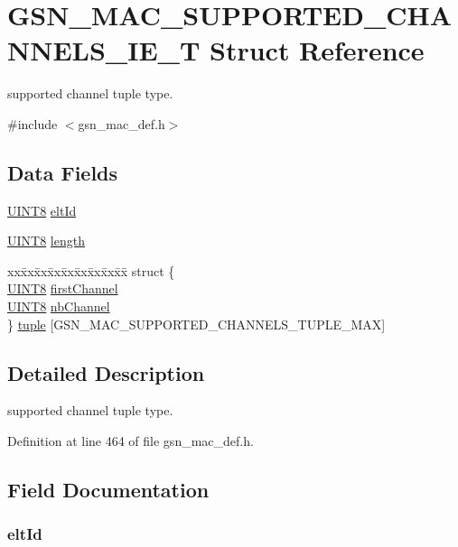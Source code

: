 \hypertarget{a00133}{
\section{GSN\_\-MAC\_\-SUPPORTED\_\-CHANNELS\_\-IE\_\-T Struct Reference}
\label{a00133}
}


supported channel tuple type.  




{\ttfamily \#include $<$gsn\_\-mac\_\-def.h$>$}

\subsection*{Data Fields}
\begin{DoxyCompactItemize}
\item 
\hyperlink{a00660_gab27e9918b538ce9d8ca692479b375b6a}{UINT8} \hyperlink{a00133_a51c62ca06caf5fff834b6a2030dd5cb0}{eltId}
\item 
\hyperlink{a00660_gab27e9918b538ce9d8ca692479b375b6a}{UINT8} \hyperlink{a00133_ae360fb41f422c7c83b87d9af070cbd31}{length}
\item 
\begin{tabbing}
xx\=xx\=xx\=xx\=xx\=xx\=xx\=xx\=xx\=\kill
struct \{\\
\>\hyperlink{a00660_gab27e9918b538ce9d8ca692479b375b6a}{UINT8} \hyperlink{a00133_a1e18c5cf2df41f1ce98b2d9bbac0b385}{firstChannel}\\
\>\hyperlink{a00660_gab27e9918b538ce9d8ca692479b375b6a}{UINT8} \hyperlink{a00133_a510336fcf155f5fbb50635e76a86456e}{nbChannel}\\
\} \hyperlink{a00133_a4fbe8cde4e4aec65bee67df10076a167}{tuple} \mbox{[}GSN\_MAC\_SUPPORTED\_CHANNELS\_TUPLE\_MAX\mbox{]}\\

\end{tabbing}\end{DoxyCompactItemize}


\subsection{Detailed Description}
supported channel tuple type. 

Definition at line 464 of file gsn\_\-mac\_\-def.h.



\subsection{Field Documentation}
\hypertarget{a00133_a51c62ca06caf5fff834b6a2030dd5cb0}{
\subsubsection[{eltId}]{ {\bf eltId}}}
\label{a00133_a51c62ca06caf5fff834b6a2030dd5cb0}


